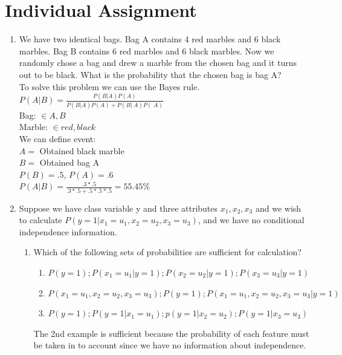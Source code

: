 \documentclass[12pt,letterpaper]{article}
\begin{document}
\section[2.]{Individual Assignment} 
\begin{enumerate} 
	\item We have two identical bags. Bag A contains 4 red marbles and 6 black marbles. Bag B contains 6 red marbles and 6 black marbles. Now we randomly chose a bag and drew a marble from the chosen bag and it turns out to be black. What is the probability that the chosen bag is bag A? \\
	To solve this problem we can use the Bayes rule. \\
	$ P(A|B) = \frac{P(B|A)P(A)}{P(B|A)P(A) + P(B|~A)P(~A)}$ \\
	Bag: $\in {A,B}$ \\
	Marble: $\in {red,black}$ \\
	We can define event: \\
	$A =$ Obtained black marble \\
	$B =$ Obtained bag A \\
	$P(B) = .5$, $P(A) = .6$ \\
	$P(A|B) = \frac{.3*.5}{.3*.5 + .5*.5*.5} = 55.45\%$ \\
	\item Suppose we have class variable y and three attributes $x_{1}, x_{2}, x_{3}$ and we wish to calculate $P(y = 1 | x_{1} = u_{1}, x_{2} = u_{2}, x_{3} = u_{3})$, and we have no conditional independence information. \\
	\begin{enumerate}
		\item Which of the following sets of probabilities are sufficient for calculation? \\
		\begin{enumerate} 
			\item $P(y = 1); P(x_{1} = u_{1} | y = 1); P( x_{2} = u_{2} | y = 1); P(x_{3} = u_{3} | y = 1)$ \\
			\item $P(x_{1} = u_{1}, x_{2} = u_{2}, x_{3} = u_{3}); P(y = 1); P(x_{1} = u_{1}, x_{2} = u_{2}, x_{3} = u_{3} | y = 1)$ \\
			\item $P(y = 1); P(y = 1| x_{1} = u_{1}); p(y = 1 | x_{2} = u_{2}); P(y = 1 | x_{3} = u_{3})$ \\
		\end{enumerate} 
		The 2nd example is sufficient because the probability of each feature must be taken in to account since we have no information about independence.\\

\end{enumerate}
\end{enumerate}
\end{document}
